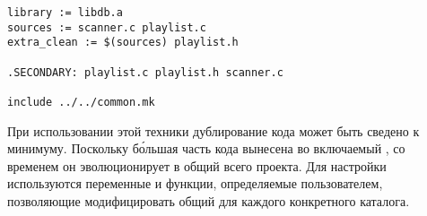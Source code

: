 {\footnotesize
\begin{verbatim}
library := libdb.a
sources := scanner.c playlist.c
extra_clean := $(sources) playlist.h

.SECONDARY: playlist.c playlist.h scanner.c

include ../../common.mk
\end{verbatim}
}

При использовании этой техники дублирование кода может быть сведено к
минимуму. Поскольку б\'{о}льшая часть кода вынесена во включаемый
\Makefile{}, со временем он эволюционирует в общий \Makefile{} всего
проекта. Для настройки используются переменные \GNUmake{} и функции,
определяемые пользователем, позволяющие модифицировать общий
\Makefile{} для каждого конкретного каталога.
